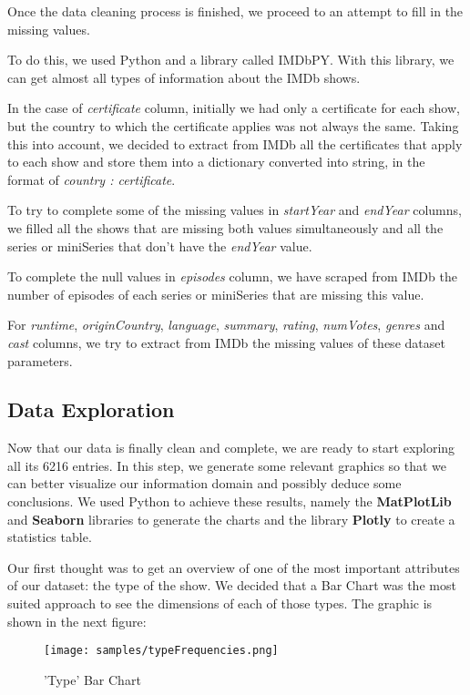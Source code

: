 \documentclass[sigplan,screen]{acmart}
\begin{document}
Once the data cleaning process is finished, we proceed to an attempt to fill in the missing values.

To do this, we used Python and a library called IMDbPY. With this library, we can get almost all types of information about the IMDb shows.

In the case of \textit{certificate} column, initially we had only a certificate for each show, but the country to which the certificate applies was not always the same. Taking this into account, we decided to extract from IMDb all the certificates that apply to each show and store them into a dictionary converted into string, in the format of \textit{country : certificate}.

To try to complete some of the missing values in \textit{startYear} and \textit{endYear} columns, we filled all the shows that are missing both values simultaneously and all the series or miniSeries that don't have the \textit{endYear} value.

To complete the null values in \textit{episodes} column, we have scraped from IMDb the number of episodes of each series or miniSeries that are missing this value.

For \textit{runtime}, \textit{originCountry}, \textit{language}, \textit{summary}, \textit{rating}, \textit{numVotes}, \textit{genres} and \textit{cast} columns, we try to extract from IMDb the missing values of these dataset parameters.

\subsection{Data Exploration}

Now that our data is finally clean and complete, we are ready to start exploring all its 6216 entries. In this step, we generate some relevant graphics so that we can better visualize our information domain and possibly deduce some conclusions. We used Python to achieve these results, namely the \textbf{MatPlotLib} and \textbf{Seaborn} libraries to generate the charts and the library \textbf{Plotly} to create a statistics table.

Our first thought was to get an overview of one of the most important attributes of our dataset: the type of the show. We decided that a Bar Chart was the most suited approach to see the dimensions of each of those types. The graphic is shown in the next figure: 

\begin{figure}[h]
  \centering
  \texttt{[image: samples/typeFrequencies.png]}
  \caption{'Type' Bar Chart}
\end{figure}
\end{document}
